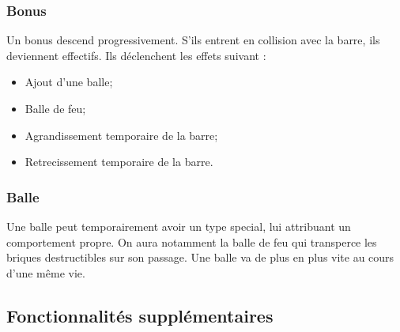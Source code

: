   \subsubsection{Bonus}
  Un bonus descend progressivement. S'ils entrent en collision avec la barre, ils deviennent effectifs.
  Ils déclenchent les effets suivant :
  \begin{itemize}
    \item Ajout d'une balle;
    \item Balle de feu;
    \item Agrandissement temporaire de la barre;
    \item Retrecissement temporaire de la barre.
  \end{itemize}

  \subsubsection{Balle}
  Une balle peut temporairement avoir un type special, lui attribuant un comportement propre.
  On aura notamment la balle de feu qui transperce les briques destructibles sur son passage.
  Une balle va de plus en plus vite au cours d'une même vie.

  \newpage
  \subsection{Fonctionnalités supplémentaires}

